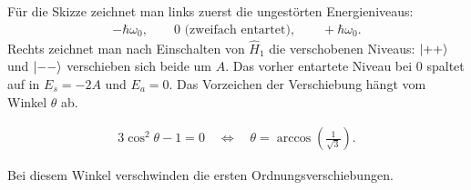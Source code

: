 \documentclass[11pt,a4paper]{scrartcl}
\newcommand{\op}[1]{\hat{#1}}
\begin{document}
\begin{enumerate}[label=(\alph*)]
\begin{calculationbox}
            \begin{calculationbox}[title=Beschreibung der Skizze]
                Für die Skizze zeichnet man links zuerst die ungestörten Energieniveaus:
                \begin{align*}
                    -\hbar\omega_0,
                    \qquad
                    0 \text{ (zweifach entartet)},
                    \qquad
                    +\hbar\omega_0.
                \end{align*}
                Rechts zeichnet man nach Einschalten von $\op H_1$ die verschobenen Niveaus: $\ket{++}$ und $\ket{--}$ verschieben sich beide um $A$. Das vorher entartete Niveau bei $0$ spaltet auf in $E_s=-2A$ und $E_a=0$. Das Vorzeichen der Verschiebung hängt vom Winkel $\theta$ ab.

                \begin{solutionbox}[title=Magischer Winkel]
                    \begin{align*}
                        3\cos^2\theta-1=0
                        \quad\Longleftrightarrow\quad
                        \theta=\arccos\left(\frac{1}{\sqrt3}\right).
                    \end{align*}
                \end{solutionbox}
                Bei diesem Winkel verschwinden die ersten Ordnungsverschiebungen.
            \end{calculationbox}
        \end{calculationbox}
    \end{enumerate}
\end{document}

